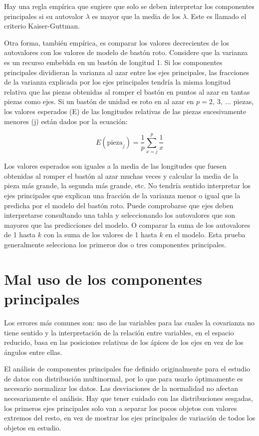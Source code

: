 \documentclass[]{book}
\theoremstyle{definition}
\theoremstyle{definition}
\theoremstyle{definition}
\theoremstyle{remark}
\begin{document}
Hay una regla empírica que sugiere que solo se deben interpretar los
componentes principales si su autovalor \(\lambda\) es mayor que la
media de los \(\lambda\). Este es llamado el criterio Kaiser-Guttman.

Otra forma, también empírica, es comparar los valores decrecientes de
los autovalores con los valores de modelo de bastón roto. Considere que
la varianza es un recurso embebida en un bastón de longitud 1. Si los
componentes principales dividieran la varianza al azar entre los ejes
principales, las fracciones de la varianza explicada por los ejes
principales tendría la misma longitud relativa que las piezas obtenidas
al romper el bastón en puntos al azar en tantas piezas como ejes. Si un
bastón de unidad es roto en al azar en \(p = 2,\ 3,\ \ldots\) piezas,
los valores esperados (E) de las longitudes relativas de las piezas
sucesivamente menores (j) están dados por la ecuación:

\[
E\left( \text{pieza}_{j} \right) = \frac{1}{p}\sum_{x = j}^{p}\frac{1}{x}
\]

Los valores esperados son iguales a la media de las longitudes que
fuesen obtenidas al romper el bastón al azar muchas veces y calcular la
media de la pieza más grande, la segunda más grande, etc. No tendría
sentido interpretar los ejes principales que explican una fracción de la
varianza menor o igual que la predicha por el modelo del bastón roto.
Puede comprobarse que ejes deben interpretarse consultando una tabla y
seleccionando los autovalores que son mayores que las predicciones del
modelo. O comparar la suma de los autovalores de 1 hasta \(k\) con la
suma de los valores de 1 hasta \(k\) en el modelo. Esta prueba
generalmente selecciona los primeros dos o tres componentes principales.

\hypertarget{mal-uso-de-los-componentes-principales}{%
\section{Mal uso de los componentes
principales}\label{mal-uso-de-los-componentes-principales}}

Los errores más comunes son: uso de las variables para las cuales la
covarianza no tiene sentido y la interpretación de la relación entre
variables, en el espacio reducido, basa en las posiciones relativas de
los ápices de los ejes en vez de los ángulos entre ellas.

El análisis de componentes principales fue definido originalmente para
el estudio de datos con distribución multinormal, por lo que para usarlo
óptimamente es necesario normalizar los datos. Las desviaciones de la
normalidad no afectan necesariamente el análisis. Hay que tener cuidado
con las distribuciones sesgadas, los primeros ejes principales solo van
a separar los pocos objetos con valores extremos del resto, en vez de
mostrar los ejes principales de variación de todos los objetos en
estudio.
\end{document}
